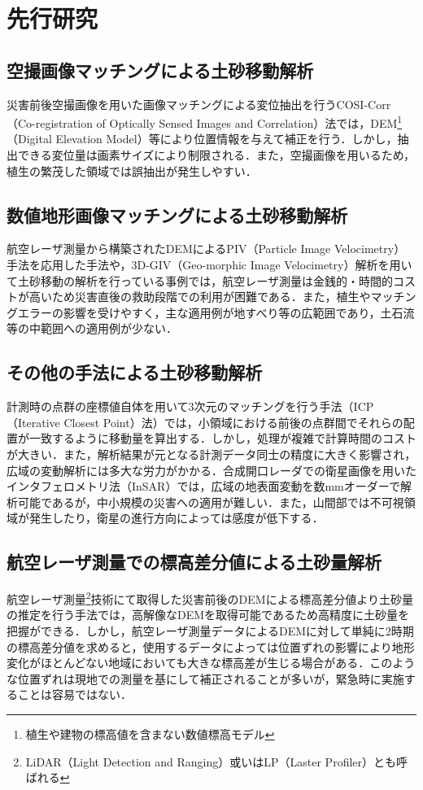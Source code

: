   \section{先行研究}
    \subsection*{空撮画像マッチングによる土砂移動解析}
      災害前後空撮画像を用いた画像マッチングによる変位抽出を行うCOSI-Corr（Co-registration of Optically Sensed Images and Correlation）法\cite{土砂移動解析1}では，DEM\footnote{植生や建物の標高値を含まない数値標高モデル}（Digital Elevation Model）等により位置情報を与えて補正を行う．しかし，抽出できる変位量は画素サイズにより制限される．また，空撮画像を用いるため，植生の繁茂した領域では誤抽出が発生しやすい．


    \subsection*{数値地形画像マッチングによる土砂移動解析}
      航空レーザ測量から構築されたDEMによるPIV（Particle Image Velocimetry）手法\cite{土砂移動解析2}を応用した手法や，3D-GIV（Geo-morphic Image Velocimetry）解析\cite{土砂移動解析3, 土砂移動解析4, 土砂移動解析5}を用いて土砂移動の解析を行っている事例では，航空レーザ測量は金銭的・時間的コストが高いため災害直後の救助段階での利用が困難である．また，植生やマッチングエラーの影響を受けやすく，主な適用例が地すべり等の広範囲であり，土石流等の中範囲への適用例が少ない．
      

    \subsection*{その他の手法による土砂移動解析}
      計測時の点群の座標値自体を用いて3次元のマッチングを行う手法（ICP（Iterative Closest Point）法）\cite{土砂移動解析5}では，小領域における前後の点群間でそれらの配置が一致するように移動量を算出する．しかし，処理が複雑で計算時間のコストが大きい．また，解析結果が元となる計測データ同士の精度に大きく影響され，広域の変動解析には多大な労力がかかる．合成開口レーダでの衛星画像を用いたインタフェロメトリ法（InSAR）\cite{土砂移動解析6}では，広域の地表面変動を数mmオーダーで解析可能であるが，中小規模の災害への適用が難しい．また，山間部では不可視領域が発生したり，衛星の進行方向によっては感度が低下する．


    \subsection*{航空レーザ測量での標高差分値による土砂量解析}
      \label{}
      航空レーザ測量\footnote{LiDAR（Light Detection and Ranging）或いはLP（Laster Profiler）とも呼ばれる}技術にて取得した災害前後のDEMによる標高差分値より土砂量の推定を行う手法\cite{土砂量解析1, 土砂量解析2}では，高解像なDEMを取得可能であるため高精度に土砂量を把握ができる．しかし，航空レーザ測量データによるDEMに対して単純に2時期の標高差分値を求めると，使用するデータによっては位置ずれの影響により地形変化がほとんどない地域においても大きな標高差が生じる場合がある．このような位置ずれは現地での測量を基にして補正されることが多いが，緊急時に実施することは容易ではない．


